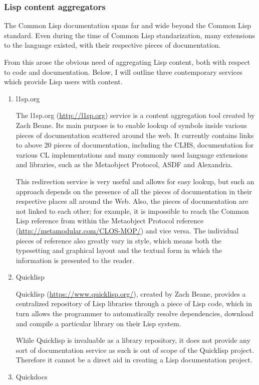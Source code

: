 \subsubsection{Lisp content aggregators}\label{lisp-content-aggregators}

The Common Lisp documentation spans far and wide beyond the Common Lisp
standard. Even during the time of Common Lisp standarization, many
extensions to the language existed, with their respective pieces of
documentation.

From this arose the obvious need of aggregating Lisp content, both with
respect to code and documentation. Below, I will outline three
contemporary services which provide Lisp users with content.

\begin{enumerate}
\item
  l1sp.org

  The l1sp.org (\url{http://l1sp.org}) service is a content aggregation
  tool created by Zach Beane. Its main purpose is to enable lookup of
  symbols inside various pieces of documentation scattered around the
  web. It currently contains links to above 20 pieces of documentation,
  including the CLHS, documentation for various CL implementations and
  many commonly used language extensions and libraries, such as the
  Metaobject Protocol, ASDF and Alexandria.

  This redirection service is very useful and allows for easy lookup,
  but such an approach depends on the presence of all the pieces of
  documentation in their respective places all around the Web. Also, the
  pieces of documentation are not linked to each other; for example, it
  is impossible to reach the Common Lisp reference from within the
  Metaobject Protocol reference (\url{http://metamodular.com/CLOS-MOP/})
  and vice versa. The individual pieces of reference also greatly vary
  in style, which means both the typesetting and graphical layout and
  the textual form in which the information is presented to the reader.
\item
  Quicklisp

  Quicklisp (\url{https://www.quicklisp.org/}), created by Zach Beane,
  provides a centralized repository of Lisp libraries through a piece of
  Lisp code, which in turn allows the programmer to automatically
  resolve dependencies, download and compile a particular library on
  their Lisp system.

  While Quicklisp is invaluable as a library repository, it does not
  provide any sort of documentation service as such is out of scope of
  the Quicklisp project. Therefore it cannot be a direct aid in creating
  a Lisp documentation project.
\item
  Quickdocs


\end{enumerate}
